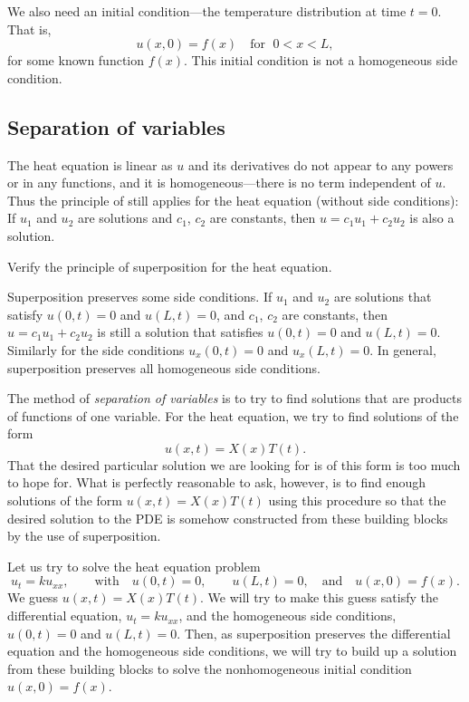 We also need an initial condition---the temperature distribution
at time $t=0$.  That is,
\begin{equation*}
u(x,0) = f(x)
\quad \text{for } \; 0 < x < L ,
\end{equation*}
for some known function $f(x)$.
This initial condition is not a homogeneous side condition.

\subsection{Separation of variables}

The heat equation is linear as $u$ and its derivatives do not
appear to any powers or in any functions,
and it is homogeneous---there is no term independent of $u$.
Thus the principle of  still applies for
the heat equation
(without side conditions):
If $u_1$ and $u_2$ are
solutions and $c_1$, $c_2$ are constants, then
$u = c_1 u_1 + c_2 u_2$ is also a solution.

\begin{exercise}
Verify the principle of superposition for the heat equation.
\end{exercise}

Superposition preserves some side conditions.
If $u_1$ and $u_2$ are
solutions that satisfy $u(0,t) = 0$ and $u(L,t) = 0$,
and $c_1$, $c_2$ are constants, then
$u = c_1 u_1 + c_2 u_2$ is still a solution
that satisfies $u(0,t) = 0$ and $u(L,t) = 0$.  Similarly
for the side conditions $u_x(0,t) = 0$ and $u_x(L,t) = 0$.  In general,
superposition preserves all homogeneous side conditions.

The method of
\emph{separation of variables} is to
try to find solutions that are products of functions of one variable.
For the heat equation, we try to find solutions of the form
\begin{equation*}
u(x,t) = X(x)T(t) .
\end{equation*}
That the desired particular solution we are looking for is of this form is too much to
hope for.  What is perfectly reasonable to ask, however, is to find
enough  solutions of the form
$u(x,t) = X(x)T(t)$ using this procedure
so that the desired solution to the PDE is somehow constructed from these
building blocks by the use of superposition.

Let us try to solve the heat equation problem
\begin{equation*}
u_t = k u_{xx},
\qquad \text{with} \quad
u(0,t) = 0 ,\quad \quad u(L,t) = 0,
\quad \text{and} \quad u(x,0) = f(x) .
\end{equation*}
We guess $u(x,t) = X(x)T(t)$.  We will try to make this guess satisfy the
differential equation, $u_t = k u_{xx}$, and the homogeneous side conditions,
$u(0,t) = 0$ and $u(L,t) = 0$.  Then, as superposition preserves the
differential equation and the homogeneous side conditions, we will try to
build up a solution from these building blocks to solve the
nonhomogeneous initial condition $u(x,0) = f(x)$.


